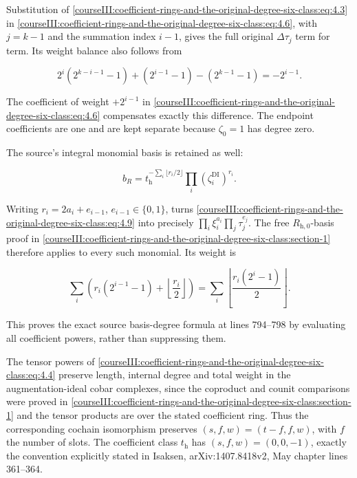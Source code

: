 Substitution of \eqref{courseIII:coefficient-rings-and-the-original-degree-six-class:eq:4.3} in \eqref{courseIII:coefficient-rings-and-the-original-degree-six-class:eq:4.6}, with \(j=k-1\) and the summation index \(i-1\), gives the full original \(\Delta\tau_j\) term for term. Its weight balance also follows from

\begin{equation}
2^i(2^{k-i-1}-1)+(2^{i-1}-1)
             -(2^{k-1}-1)=-2^{i-1}.
 \label{courseIII:coefficient-rings-and-the-original-degree-six-class:eq:4.8}
\end{equation}

The coefficient of weight \(+2^{i-1}\) in \eqref{courseIII:coefficient-rings-and-the-original-degree-six-class:eq:4.6} compensates exactly this difference. The endpoint coefficients are one and are kept separate because \(\zeta_0=1\) has degree zero.

The source's integral monomial basis is retained as well:

\begin{equation}
b_R=t_{\mathrm h}^{-\sum_i\lfloor r_i/2\rfloor}
                    \prod_i(\zeta_i^{\mathrm{DI}})^{r_i}.
 \label{courseIII:coefficient-rings-and-the-original-degree-six-class:eq:4.9}
\end{equation}

Writing \(r_i=2a_i+e_{i-1}\), \(e_{i-1}\in\{0,1\}\), turns \eqref{courseIII:coefficient-rings-and-the-original-degree-six-class:eq:4.9} into precisely
\(\prod_i\xi_i^{a_i}\prod_j\tau_j^{e_j}\). The free \(R_{\mathrm h,0}\)-basis proof in \cref{courseIII:coefficient-rings-and-the-original-degree-six-class:section-1} therefore applies to every such monomial. Its weight is

\begin{equation}
\sum_i\left(r_i(2^{i-1}-1)+\left\lfloor\frac{r_i}{2}\right\rfloor\right)
 =\sum_i\left\lfloor\frac{r_i(2^i-1)}2\right\rfloor .
 \label{courseIII:coefficient-rings-and-the-original-degree-six-class:eq:4.10}
\end{equation}

This proves the exact source basis-degree formula at lines 794--798 by evaluating all coefficient powers, rather than suppressing them.

The tensor powers of \eqref{courseIII:coefficient-rings-and-the-original-degree-six-class:eq:4.4} preserve length, internal degree and total weight in the augmentation-ideal cobar complexes, since the coproduct and counit comparisons were proved in \cref{courseIII:coefficient-rings-and-the-original-degree-six-class:section-1} and the tensor products are over the stated coefficient ring. Thus the corresponding cochain isomorphism preserves \((s,f,w)=(t-f,f,w)\), with \(f\) the number of slots. The coefficient class \(t_{\mathrm h}\) has \((s,f,w)=(0,0,-1)\), exactly the convention explicitly stated in Isaksen, arXiv:1407.8418v2, May chapter lines 361--364.


